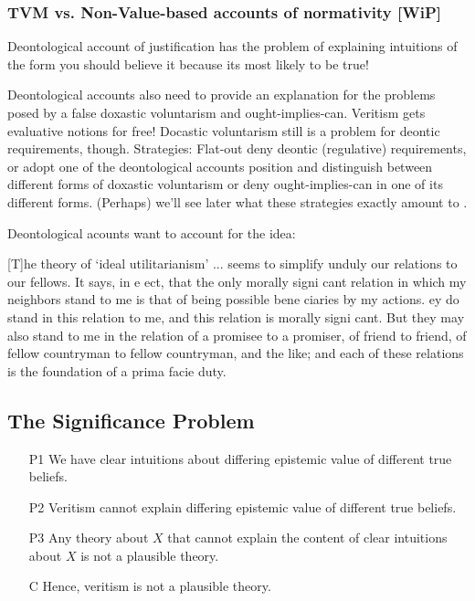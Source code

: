 \documentclass[12pt,numbers=noenddot]{scrartcl}
\begin{document}
\subsubsection{ TVM vs. Non-Value-based accounts of normativity [WiP]}

    Deontological account of justification  has the problem of explaining intuitions of the form you should believe it because its most likely to be true!

    Deontological accounts also need to provide an explanation for the problems posed by a false doxastic voluntarism and ought-implies-can. Veritism gets evaluative notions for free! Docastic voluntarism still is a problem for deontic requirements, though. Strategies: Flat-out deny deontic (regulative) requirements, or adopt one of the deontological accounts position and distinguish between different forms of doxastic voluntarism or deny ought-implies-can in one of its different forms. (Perhaps) we'll see later what these strategies exactly amount to .

    Deontological acounts want to account for the idea:

    [T]he theory of ‘ideal utilitarianism’ ... seems to simplify unduly our relations to our fellows. It says, in e ect, that the only morally signi cant relation in which my neighbors stand to me is that of being possible bene ciaries by my actions.  ey do stand in this relation to me, and this relation is morally signi cant. But they may also stand to me in the relation of a promisee to a promiser, of friend to friend, of fellow countryman to fellow countryman, and the like; and each of these relations is the foundation of a prima facie duty. \autocite[19]{Ross1930}

\subsection{The Significance Problem}


\begin{enumerate}
    \item[P1] We have clear intuitions about differing epistemic value of different true beliefs.
    \item[P2] Veritism cannot explain differing epistemic value of different true beliefs.
    \item[P3] Any theory about $X$ that cannot explain the content of clear intuitions about $X$ is not a plausible theory.
    \item[C] Hence, veritism is not a plausible theory.
\end{enumerate}
\end{document}
